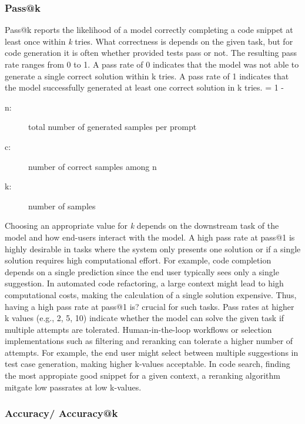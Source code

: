 \documentclass[11pt]{article}
\begin{document}
\subsubsection{Pass@k}
Pass@k reports the likelihood of a model correctly completing a code snippet at least once within \emph{k} tries.
What correctness is depends on the given task, but for code generation it is often whether provided tests pass or not.
The resulting pass rate ranges from 0 to 1.
A pass rate of 0 indicates that the model was not able to generate a single correct solution within k tries.
A pass rate of 1 indicates that the model successfully generated at least one correct solution in k tries.
 = 1 - 
\begin{description}
    \item[n:] total number of generated samples per prompt
    \item[c:] number of correct samples among  n
    \item[k:] number of samples
\end{description}

Choosing an appropriate value for \emph{k} depends on the downstream task of the model and how end-users interact with the model.
A high pass rate at pass@1 is highly desirable in tasks where the system only presents one solution or if a single solution requires high computational effort.
For example, code completion depends on a single prediction since the end user typically sees only a single suggestion.
In automated code refactoring, a large context might lead to high computational costs, making the calculation of a single solution expensive.
Thus, having a high pass rate at pass@1 is? crucial for such tasks.
Pass rates at higher k values (e.g., 2, 5, 10) indicate whether the model can solve the given task if multiple attempts are tolerated.
Human-in-the-loop workflows or selection implementations such as filtering and reranking can tolerate a higher number of attempts.
For example, the end user might select between multiple suggestions in test case generation, making higher k-values acceptable.
In code search, finding the most appropiate good snippet for a given context, a reranking algorithm mitgate low passrates at low k-values.

\subsubsection{Accuracy/ Accuracy@k}
\todo{}
\end{document}
